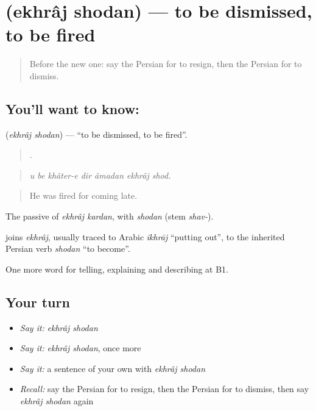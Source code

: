 \section[\texorpdfstring{\fa{اخراج} \fa{شدن} (ekhrâj shodan)}{اخراج شدن (ekhrâj shodan)}]{  (ekhrâj shodan) — to be dismissed, to be fired}

\label{lesson:FA-C379-ekhraj-shodan}



\begin{quote}
Before the new one: say the Persian for to resign, then the Persian for to dismiss.
\end{quote}

\subsection*{You'll want to know:  }
\textbf{ } (\emph{ekhrâj shodan}) — \textquotedblleft{}to be dismissed, to be fired\textquotedblright{}.

\begin{quote}
      .
\end{quote}

\begin{quote}
\emph{u be khâter-e dir âmadan ekhrâj shod.}
\end{quote}

\begin{quote}
He was fired for coming late.
\end{quote}

The passive of \emph{ekhrâj kardan}, with \emph{shodan} (stem \emph{shav-}).

\begin{cousinweb}
\textbf{ } joins \emph{ekhrâj}, usually traced to Arabic \emph{ikhrāj} \textquotedblleft{}putting out\textquotedblright{}, to the inherited Persian verb \emph{shodan} \textquotedblleft{}to become\textquotedblright{}.
\end{cousinweb}

\begin{grammarlens}[title={What you've built}]
One more word for telling, explaining and describing at B1.
\end{grammarlens}

\subsection*{Your turn}
\begin{itemize}
\raggedright
  \item \emph{Say it:} \emph{ekhrâj shodan}
  \item \emph{Say it:} \emph{ekhrâj shodan}, once more
  \item \emph{Say it:} a sentence of your own with \emph{ekhrâj shodan}
  \item \emph{Recall:} say the Persian for to resign, then the Persian for to dismiss, then say \emph{ekhrâj shodan} again
\end{itemize}

